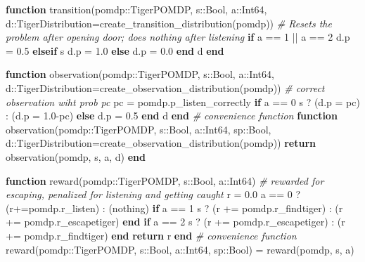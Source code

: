 \documentclass[12pt,]{article}
\newenvironment{Shaded}{}{}
\newcommand{\KeywordTok}[1]{\textcolor[rgb]{0.00,0.44,0.13}{\textbf{{#1}}}}
\newcommand{\DataTypeTok}[1]{\textcolor[rgb]{0.56,0.13,0.00}{{#1}}}
\newcommand{\FloatTok}[1]{\textcolor[rgb]{0.25,0.63,0.44}{{#1}}}
\newcommand{\CommentTok}[1]{\textcolor[rgb]{0.38,0.63,0.69}{\textit{{#1}}}}
\newcommand{\NormalTok}[1]{{#1}}
\begin{document}
\begin{Shaded}
\begin{Highlighting}[]
\KeywordTok{function} \NormalTok{transition(pomdp::TigerPOMDP, s::}\DataTypeTok{Bool}\NormalTok{,
a::}\DataTypeTok{Int64}\NormalTok{,}
                   \NormalTok{ d::TigerDistribution=create_transition_distribution(pomdp))}
    \CommentTok{# Resets the problem after opening door; does nothing after listening        }
    \KeywordTok{if} \NormalTok{a == }\FloatTok{1} \NormalTok{|| a == }\FloatTok{2}
        \NormalTok{d.p = }\FloatTok{0.5}
    \KeywordTok{elseif} \NormalTok{s}
        \NormalTok{d.p = }\FloatTok{1.0}
    \KeywordTok{else}
        \NormalTok{d.p = }\FloatTok{0.0}
    \KeywordTok{end}
    \NormalTok{d}
\KeywordTok{end}

\KeywordTok{function} \NormalTok{observation(pomdp::TigerPOMDP, s::}\DataTypeTok{Bool}\NormalTok{,
a::}\DataTypeTok{Int64}\NormalTok{,}
                    \NormalTok{ d::TigerDistribution=create_observation_distribution(pomdp))}
    \CommentTok{# correct observation wiht prob pc        }
    \NormalTok{pc = pomdp.p_listen_correctly}
    \KeywordTok{if} \NormalTok{a == }\FloatTok{0}
        \NormalTok{s ? (d.p = pc) : (d.p = }\FloatTok{1.0}\NormalTok{-pc)}
    \KeywordTok{else}
        \NormalTok{d.p = }\FloatTok{0.5}
    \KeywordTok{end}
    \NormalTok{d}
\KeywordTok{end}
\CommentTok{# convenience function}
\KeywordTok{function} \NormalTok{observation(pomdp::TigerPOMDP, s::}\DataTypeTok{Bool}\NormalTok{,
a::}\DataTypeTok{Int64}\NormalTok{, sp::}\DataTypeTok{Bool}\NormalTok{, }
                     \NormalTok{d::TigerDistribution=create_observation_distribution(pomdp))}
    \KeywordTok{return} \NormalTok{observation(pomdp, s, a, d)}
\KeywordTok{end}

\KeywordTok{function} \NormalTok{reward(pomdp::TigerPOMDP, s::}\DataTypeTok{Bool}\NormalTok{, a::}\DataTypeTok{Int64}\NormalTok{)}
    \CommentTok{# rewarded for escaping, penalized for listening and getting caught}
    \NormalTok{r = }\FloatTok{0.0}
    \NormalTok{a == }\FloatTok{0} \NormalTok{? (r+=pomdp.r_listen) : (nothing)}
    \KeywordTok{if} \NormalTok{a == }\FloatTok{1}
        \NormalTok{s ? (r += pomdp.r_findtiger) : (r += pomdp.r_escapetiger)}
    \KeywordTok{end}
    \KeywordTok{if} \NormalTok{a == }\FloatTok{2}
        \NormalTok{s ? (r += pomdp.r_escapetiger) : (r += pomdp.r_findtiger)}
    \KeywordTok{end}
    \KeywordTok{return} \NormalTok{r}
\KeywordTok{end}
\CommentTok{# convenience function}
\NormalTok{reward(pomdp::TigerPOMDP, s::}\DataTypeTok{Bool}\NormalTok{, a::}\DataTypeTok{Int64}\NormalTok{, sp::}\DataTypeTok{Bool}\NormalTok{) = reward(pomdp, s, a)}
\end{Highlighting}
\end{Shaded}
\end{document}
